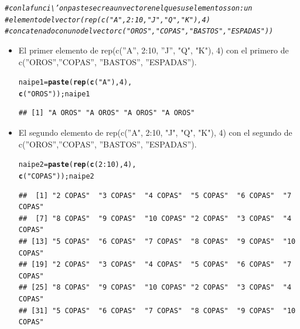\documentclass[12pt,letterpaper]{article}\usepackage[]{graphicx}\usepackage[]{color}
\makeatletter
\newcommand{\hlnum}[1]{\textcolor[rgb]{0.686,0.059,0.569}{#1}}%
\newcommand{\hlstr}[1]{\textcolor[rgb]{0.192,0.494,0.8}{#1}}%
\newcommand{\hlcom}[1]{\textcolor[rgb]{0.678,0.584,0.686}{\textit{#1}}}%
\newcommand{\hlopt}[1]{\textcolor[rgb]{0,0,0}{#1}}%
\newcommand{\hlstd}[1]{\textcolor[rgb]{0.345,0.345,0.345}{#1}}%
\newcommand{\hlkwb}[1]{\textcolor[rgb]{0.69,0.353,0.396}{#1}}%
\newcommand{\hlkwd}[1]{\textcolor[rgb]{0.737,0.353,0.396}{\textbf{#1}}}%
\newenvironment{kframe}{%
 \def\at@end@of@kframe{}%
 \ifinner\ifhmode%
  \def\at@end@of@kframe{\end{minipage}}%
  \begin{minipage}{\columnwidth}%
 \fi\fi%
 \def\FrameCommand##1{\hskip\@totalleftmargin \hskip-\fboxsep
 \colorbox{shadecolor}{##1}\hskip-\fboxsep
     \hskip-\linewidth \hskip-\@totalleftmargin \hskip\columnwidth}%
 \MakeFramed {\advance\hsize-\width
   \@totalleftmargin\z@ \linewidth\hsize
   \@setminipage}}%
 {\par\unskip\endMakeFramed%
 \at@end@of@kframe}
\newenvironment{knitrout}{}{} %
\makeatother
\begin{document}
\begin{enumerate}
\begin{knitrout}
\color{fgcolor}\begin{kframe}
\begin{alltt}
\hlcom{#con la funci\textbackslash{}'on paste se crea un vector en el que sus elementos son: un }
\hlcom{# elemento del vector (rep(c("A", 2:10, "J", "Q", "K"), 4)}
\hlcom{# concatenado con uno del vector c("OROS","COPAS", "BASTOS", "ESPADAS")) }
\end{alltt}
\end{kframe}
\end{knitrout}

\begin{itemize}
\item El primer elemento de rep(c(''A'', 2:10, ''J'', "Q", "K"), 4) con el primero de c(''OROS'',''COPAS'', ''BASTOS'', ''ESPADAS'').

\begin{knitrout}
\color{fgcolor}\begin{kframe}
\begin{alltt}
\hlstd{naipe1} \hlkwb{=} \hlkwd{paste}\hlstd{(}\hlkwd{rep}\hlstd{(}\hlkwd{c}\hlstd{(}\hlstr{"A"}\hlstd{),} \hlnum{4}\hlstd{),}
              \hlkwd{c}\hlstd{(}\hlstr{"OROS"}\hlstd{));naipe1}
\end{alltt}
\begin{verbatim}
## [1] "A OROS" "A OROS" "A OROS" "A OROS"
\end{verbatim}
\end{kframe}
\end{knitrout}

\item El segundo elemento de rep(c(''A", 2:10, "J", "Q", "K"), 4) con el segundo de c(''OROS'',''COPAS'', ''BASTOS'', ''ESPADAS''). 

\begin{knitrout}
\color{fgcolor}\begin{kframe}
\begin{alltt}
\hlstd{naipe2} \hlkwb{=} \hlkwd{paste}\hlstd{(}\hlkwd{rep}\hlstd{(}\hlkwd{c}\hlstd{(} \hlnum{2}\hlopt{:}\hlnum{10}\hlstd{),} \hlnum{4}\hlstd{),}
              \hlkwd{c}\hlstd{(}\hlstr{"COPAS"}\hlstd{));naipe2}
\end{alltt}
\begin{verbatim}
##  [1] "2 COPAS"  "3 COPAS"  "4 COPAS"  "5 COPAS"  "6 COPAS"  "7 COPAS" 
##  [7] "8 COPAS"  "9 COPAS"  "10 COPAS" "2 COPAS"  "3 COPAS"  "4 COPAS" 
## [13] "5 COPAS"  "6 COPAS"  "7 COPAS"  "8 COPAS"  "9 COPAS"  "10 COPAS"
## [19] "2 COPAS"  "3 COPAS"  "4 COPAS"  "5 COPAS"  "6 COPAS"  "7 COPAS" 
## [25] "8 COPAS"  "9 COPAS"  "10 COPAS" "2 COPAS"  "3 COPAS"  "4 COPAS" 
## [31] "5 COPAS"  "6 COPAS"  "7 COPAS"  "8 COPAS"  "9 COPAS"  "10 COPAS"
\end{verbatim}
\end{kframe}
\end{knitrout}


\end{itemize}
\end{enumerate}
\end{document}
